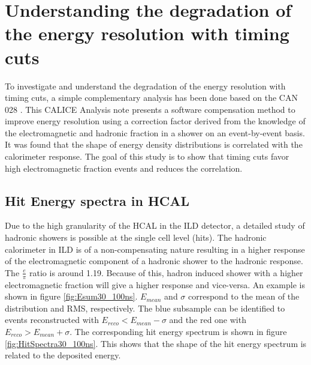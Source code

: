 \chapter{Understanding the degradation of the energy resolution with timing cuts}
\label{appendix:eresdegrad}

To investigate and understand the degradation of the energy resolution with timing cuts, a simple complementary analysis has been done based on the CAN 028 \cite{CaN028}. This CALICE Analysis note presents a software compensation method to improve energy resolution using a correction factor derived from the knowledge of the electromagnetic and hadronic fraction in a shower on an event-by-event basis. It was found that the shape of energy density distributions is correlated with the calorimeter response. The goal of this study is to show that timing cuts favor high electromagnetic fraction events and reduces the correlation.

\section{Hit Energy spectra in HCAL}

Due to the high granularity of the HCAL in the ILD detector, a detailed study of hadronic showers is possible at the single cell level (hits). The hadronic calorimeter in ILD is of a non-compensating nature resulting in a higher response of the electromagnetic component of a hadronic shower to the hadronic response. The $\frac{e}{\pi}$ ratio is around 1.19. Because of this, hadron induced shower with a higher electromagnetic fraction will give a higher response and vice-versa. An example is shown in figure \ref{fig:Esum30_100ns}. $E_{mean}$ and $\sigma$ correspond to the mean of the distribution and RMS, respectively. The blue subsample can be identified to events reconstructed with $E_{reco} < E_{mean} - \sigma$ and the red one with $E_{reco} > E_{mean} + \sigma$. The corresponding hit energy spectrum is shown in figure \ref{fig:HitSpectra30_100ns}. This shows that the shape of the hit energy spectrum is related to the deposited energy.

